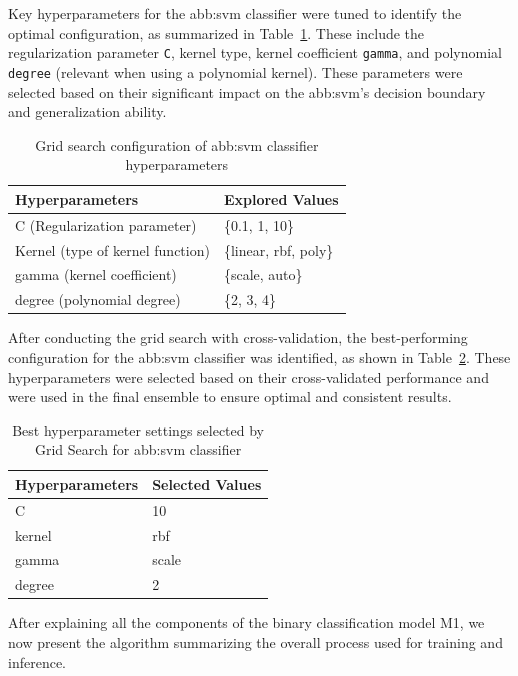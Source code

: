 Key hyperparameters for the \gls{abb:svm} classifier were tuned to identify the optimal configuration, as summarized in Table~\ref{tab:svm_grid}. These include the regularization parameter \texttt{C}, kernel type, kernel coefficient \texttt{gamma}, and polynomial \texttt{degree} (relevant when using a polynomial kernel). These parameters were selected based on their significant impact on the \gls{abb:svm}’s decision boundary and generalization ability.

\begin{table}[h]
\centering
\caption{Grid search configuration of \gls{abb:svm} classifier hyperparameters}
\begin{tabular}{|p{4.5cm}|p{8.5cm}|}
\hline
\textbf{Hyperparameters} & \textbf{Explored Values} \\
\hline
C (Regularization parameter) & \{0.1, 1, 10\} \\
\hline
Kernel (type of kernel function) & \{linear, rbf, poly\} \\
\hline
gamma (kernel coefficient) & \{scale, auto\} \\
\hline
degree (polynomial degree) & \{2, 3, 4\} \\
\hline
\end{tabular}
\label{tab:svm_grid}
\end{table}

After conducting the grid search with cross-validation, the best-performing configuration for the \gls{abb:svm} classifier was identified, as shown in Table~\ref{tab:svm_best}. These hyperparameters were selected based on their cross-validated performance and were used in the final ensemble to ensure optimal and consistent results.

\begin{table}[h]
\centering
\caption{Best hyperparameter settings selected by Grid Search for \gls{abb:svm} classifier}
\begin{tabular}{|p{4.5cm}|p{8.5cm}|}
\hline
\textbf{Hyperparameters} & \textbf{Selected Values} \\
\hline
C & 10 \\
\hline
kernel & rbf \\
\hline
gamma & scale \\
\hline
degree & 2 \\
\hline
\end{tabular}
\label{tab:svm_best}
\end{table}

After explaining all the components of the binary classification model M1, we now present the algorithm summarizing the overall process used for training and inference.




